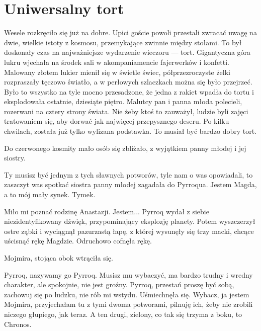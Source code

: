 \chapter{Uniwersalny tort}


Wesele rozkręciło się już na dobre. 
Upici goście powoli przestali zwracać uwagę na dwie, wielkie istoty z kosmosu, przemykające zwinnie między stołami.
To był doskonały czas na najważniejsze wydarzenie wieczoru --- tort.
Gigantyczna góra lukru wjechała na środek sali w akompaniamencie fajerwerków i konfetti. 
Malowany złotem lukier mienił się w świetle świec, półprzezroczyste żelki rozpraszały tęczowo światło, a w perłowych szlaczkach można się było przejrzeć.
Było to wszystko na tyle mocno przesadzone, że jedna z rakiet wpadła do tortu i eksplodowała ostatnie, dziesiąte piętro.
Malutcy pan i panna młoda polecieli, rozerwani na cztery strony świata.
Nie żeby ktoś to zauważył, ludzie byli zajęci tratowaniem się, aby dorwać jak najwięcej przepysznego deseru. 
Po kilku chwilach, została już tylko wylizana podstawka. To musiał być bardzo dobry tort.

Do czerwonego kosmity mało osób się zbliżało, z wyjątkiem panny młodej i jej siostry.

\ds{} Ty musisz być jednym z tych sławnych potworów, tyle nam o was opowiadali, to zaszczyt was spotkać \dm{} siostra panny młodej zagadała do Pyrroqua. \dm{}
Jestem Magda, a to mój mały synek. Tymek. \de{}

\ds{} Miło mi poznać rodzinę Anastazji. Jestem... \dm{} Pyrroq wydał z siebie niezidentyfikowany dźwięk, przypominający eksplozję planety.
Potem wyszczerzył ostre ząbki i wyciągnął pazurzastą łapę, z której wysunęły się trzy macki, chcące uścisnąć rękę Magdzie. Odruchowo cofnęła rękę. \de{}

Mojmira, stojąca obok wtrąciła się.

\ds{} Pyrroq, nazywamy go Pyrroq. Musisz mu wybaczyć, ma bardzo trudny i wredny charakter, ale spokojnie, nie jest groźny. 
Pyrroq, przestań proszę być sobą, zachowuj się po ludzku, nie rób mi wstydu.
\dm{} Uśmiechnęła się. \dm{}
Wybacz, ja jestem Mojmira, przyjechałam tu z tymi dwoma potworami, pilnuję ich, żeby nie zrobili niczego głupiego, jak teraz. 
A ten drugi, zielony, co tak się trzyma z boku, to Chronos. \de{}

